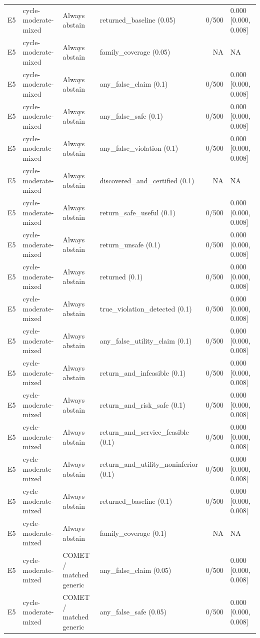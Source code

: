 \begin{longtable}{p{.04\linewidth}p{.18\linewidth}p{.19\linewidth}p{.16\linewidth}r p{.21\linewidth}}
E5 & cycle-moderate-mixed & Always abstain & returned\_baseline (0.05) & 0/500 & 0.000 [0.000, 0.008]\\
E5 & cycle-moderate-mixed & Always abstain & family\_coverage (0.05) & NA & NA\\
E5 & cycle-moderate-mixed & Always abstain & any\_false\_claim (0.1) & 0/500 & 0.000 [0.000, 0.008]\\
E5 & cycle-moderate-mixed & Always abstain & any\_false\_safe (0.1) & 0/500 & 0.000 [0.000, 0.008]\\
E5 & cycle-moderate-mixed & Always abstain & any\_false\_violation (0.1) & 0/500 & 0.000 [0.000, 0.008]\\
E5 & cycle-moderate-mixed & Always abstain & discovered\_and\_certified (0.1) & NA & NA\\
E5 & cycle-moderate-mixed & Always abstain & return\_safe\_useful (0.1) & 0/500 & 0.000 [0.000, 0.008]\\
E5 & cycle-moderate-mixed & Always abstain & return\_unsafe (0.1) & 0/500 & 0.000 [0.000, 0.008]\\
E5 & cycle-moderate-mixed & Always abstain & returned (0.1) & 0/500 & 0.000 [0.000, 0.008]\\
E5 & cycle-moderate-mixed & Always abstain & true\_violation\_detected (0.1) & 0/500 & 0.000 [0.000, 0.008]\\
E5 & cycle-moderate-mixed & Always abstain & any\_false\_utility\_claim (0.1) & 0/500 & 0.000 [0.000, 0.008]\\
E5 & cycle-moderate-mixed & Always abstain & return\_and\_infeasible (0.1) & 0/500 & 0.000 [0.000, 0.008]\\
E5 & cycle-moderate-mixed & Always abstain & return\_and\_risk\_safe (0.1) & 0/500 & 0.000 [0.000, 0.008]\\
E5 & cycle-moderate-mixed & Always abstain & return\_and\_service\_feasible (0.1) & 0/500 & 0.000 [0.000, 0.008]\\
E5 & cycle-moderate-mixed & Always abstain & return\_and\_utility\_noninferior (0.1) & 0/500 & 0.000 [0.000, 0.008]\\
E5 & cycle-moderate-mixed & Always abstain & returned\_baseline (0.1) & 0/500 & 0.000 [0.000, 0.008]\\
E5 & cycle-moderate-mixed & Always abstain & family\_coverage (0.1) & NA & NA\\
E5 & cycle-moderate-mixed & COMET / matched generic & any\_false\_claim (0.05) & 0/500 & 0.000 [0.000, 0.008]\\
E5 & cycle-moderate-mixed & COMET / matched generic & any\_false\_safe (0.05) & 0/500 & 0.000 [0.000, 0.008]\\

\end{longtable}
